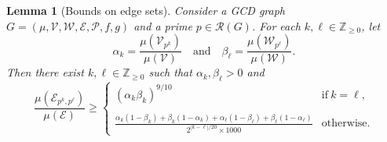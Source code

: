 \documentclass[12pt]{amsart}
\numberwithin{equation}{section}
\newtheorem{lem}{Lemma}[section]
\theoremstyle{definition}
\theoremstyle{remark}
\newcommand{\Z}{\mathbb{Z}}
\newcommand{\CE}{\mathcal{E}}
\newcommand{\CP}{\mathcal{P}}
\newcommand{\CR}{\mathcal{R}}
\newcommand{\CV}{\mathcal{V}}
\newcommand{\CW}{\mathcal{W}}
\newcommand{\ds}{\displaystyle}
\renewcommand{\ge}{\geqslant}
\begin{document}
\begin{lem}[Bounds on edge sets]\label{lem:EdgeSets}
Consider a GCD graph $G=(\mu,\CV,\CW,\CE,\CP,f,g)$ and a prime $p\in\CR(G)$. 
For each $k,\ell\in\Z_{\ge0}$, let
\[
\alpha_k=\frac{\mu(\CV_{p^k})}{\mu(\CV)}
\quad\text{and}\quad
\beta_\ell=\frac{\mu(\CW_{p^\ell})}{\mu(\CW)}.
\]
Then there exist $k,\ell\in \Z_{\ge0}$ such that $\alpha_k,\beta_\ell>0$ and
\[
\frac{\mu(\CE_{p^k,p^\ell})}{\mu(\CE)} 	
	\ge 	
		\begin{cases}
		(\alpha_k\beta_k)^{9/10}
						&\text{if}\ k=\ell,\\
						\\
			\ds\frac{\alpha_k(1-\beta_k)
				+\beta_k(1-\alpha_k)
				+\alpha_{\ell}(1-\beta_\ell)
				+\beta_\ell(1-\alpha_\ell)}{2^{|k-\ell|/20}\times 1000}
						&\text{otherwise}.
		\end{cases}
\]
\end{lem}
\end{document}
